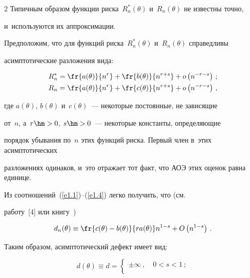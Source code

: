 \begin{multicols}{2}
Типичным образом функции риска~$R^*_n(\theta)$ и~$R_n(\theta)$ не известны точно, 


и~используются их аппроксимации.


Предположим, что для функций риска~$R^*_n(\theta)$ и~$R_n(\theta)$ справедливы 


асимптотические разложения вида:


\begin{align}


R^*_n &= \fr{a(\theta)}{n^r} + \fr{b(\theta)}{n^{r+s}} + 


o\left(n^{-r-s}\right)\,;


\label{e1.3}


\\


R_n & = \fr{a(\theta)}{n^r} + \fr{c(\theta)}{n^{r+s}} + 


o\left(n^{-r-s}\right)\,,


\label{e1.4}


\end{align}


где $a(\theta)$, $b(\theta)$ и~$c(\theta)$~--- некоторые постоянные, не зависящие 


от~$n$, а~$r\hm > 0$, $s\hm > 0$~--- некоторые константы, определяющие 


порядок убывания по~$n$ этих функций риска. Первый член в~этих асимптотических 


разложениях одинаков, и~это отражает тот факт, что АОЭ этих оценок равна единице. 


Из соотношений~(\ref{e1.1})--(\ref{e1.4}) легко получить, что (см.\


работу~[4] или книгу~\cite[с.~310]{4-ben})


\begin{equation}


d_n(\theta) \equiv \fr{c(\theta) - b(\theta)}{r a(\theta)} n^{1-s} +


O\left(n^{1-s}\right)\,.


\label{e1.5}


\end{equation}


Таким образом, асимптотический дефект имеет вид:


\begin{equation}


d(\theta) \equiv d = 


\begin{cases}


\pm\infty\,,  &\  0 < s < 1\,;\\



\end{cases}
\end{equation}
\end{multicols}
